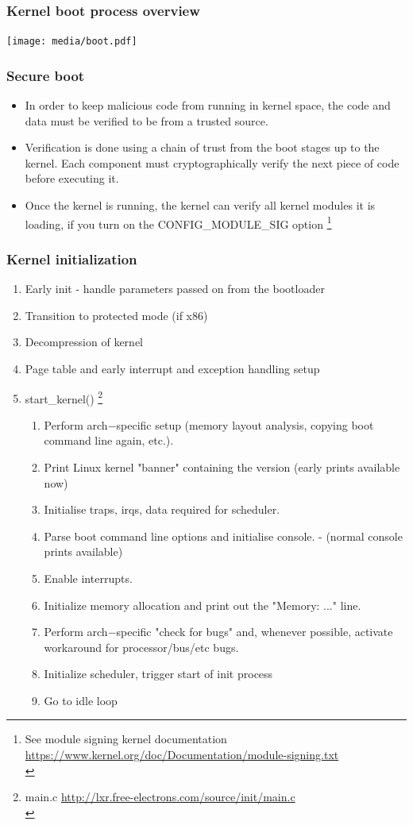 \documentclass{beamer}
\begin{document}
\begin{frame}
\frametitle{Kernel boot process overview}
\texttt{[image: media/boot.pdf]}
\end{frame}

\begin{frame}
\frametitle{Secure boot}
\begin{itemize}
	\item In order to keep malicious code from running in kernel space, the code and data must be verified to be from a trusted source.
	\item Verification is done using a chain of trust from the boot stages up to the kernel. Each component must cryptographically verify the next piece of code before executing it.
	\item Once the kernel is running, the kernel can verify all kernel modules it is loading, if you turn on the CONFIG\_MODULE\_SIG option \footnote{See module signing kernel documentation \url{https://www.kernel.org/doc/Documentation/module-signing.txt}\\}
\end{itemize}
\end{frame}

\begin{frame}
\frametitle{Kernel initialization}
\begin{enumerate}
	\item Early init - handle parameters passed on from the bootloader 
	\item Transition to protected mode (if x86)
	\item Decompression of kernel
	\item Page table and early interrupt and exception handling setup
	\item start\_kernel() \footnote{main.c \url{http://lxr.free-electrons.com/source/init/main.c} \\}
	\begin{enumerate}
		\item Perform arch−specific setup (memory layout analysis, copying boot command line again, etc.).
		\item Print Linux kernel "banner" containing the version  (early prints available now)
		\item Initialise traps, irqs, data required for scheduler.
		\item Parse boot command line options and initialise console. - (normal console prints available)
		\item Enable interrupts.
		\item Initialize memory allocation and print out the "Memory: ..." line.
		\item Perform arch−specific "check for bugs" and, whenever possible, activate workaround for processor/bus/etc bugs.
		\item Initialize scheduler, trigger start of init process
		\item Go to idle loop
	\end{enumerate}
\end{enumerate}
\end{frame}
\end{document}
